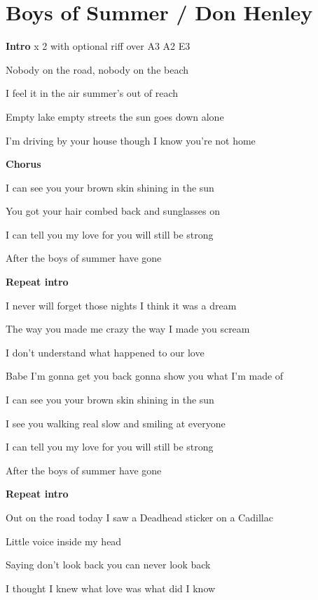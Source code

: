 \section{Boys of Summer / Don Henley}\label{sec:boysofsummer}
\Aminor
\Fmajor
\Gmajor
\Cmajor

\textbf{Intro}     x 2 with optional riff over A3 A2 E3

 Nobody on the road, nobody on the beach

 I feel it in the air summer’s out of reach

 Empty lake empty streets the sun goes down alone

 I’m driving by your house though I know you’re not home

\textbf{Chorus}

 I can see you  your brown skin shining in the sun

You got your hair combed back and  sunglasses on

 I can tell you my  love for you will still be strong 

After the boys of  summer have gone

\textbf{Repeat intro}

 I never will forget those nights I think it was a dream

 The way you made me crazy the way I made you scream

 I don’t understand what happened to our love 

Babe I’m gonna get you back gonna show you what I’m made of

 I can see you  your brown skin shining in the sun

I see you walking real slow and  smiling at everyone

 I can tell you my  love for you will still be strong

After the boys of  summer have gone

\textbf{Repeat intro}

 Out on the road today I saw a Deadhead sticker on a Cadillac

 Little voice inside my head

Saying don’t look back you can never look back

 I thought I knew what love was what did I know

